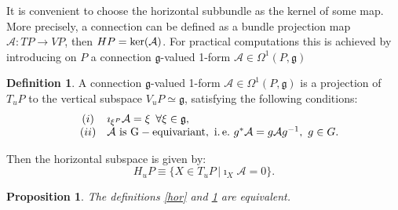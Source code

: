 \documentclass[11pt]{report}
\theoremstyle{plain}
\newtheorem{prop}[thm]{Proposition}
\theoremstyle{definition}
\newtheorem{defn}[thm]{Definition}
\theoremstyle{remark}
\theoremstyle{remark}
\numberwithin{equation}{section}
\begin{document}
It is convenient to choose the horizontal subbundle as the kernel of some map. More precisely, a connection can be defined as a bundle projection map $\mathcal{A}: TP \to VP$, then $HP = {\rm ker}(\mathcal{A})$. 
For practical computations this is achieved by introducing on $P$ a connection $\mathfrak{g}$-valued 1-form $\mathcal{A} \in \Omega^1(P,\mathfrak{g})$ 

\begin{defn}\label{form}
A connection $\mathfrak{g}$-valued 1-form $\mathcal{A} \in \Omega^1(P,\mathfrak{g})$ is a projection of $T_uP$ to the vertical subspace $V_uP \simeq \mathfrak{g}$, satisfying the following conditions:
\[\begin{array}{lcl}
&(i)& \imath_{\xi^P} \mathcal{A} = \xi \, \, \, \forall \xi \in \mathfrak{g},\\

&(ii)& \mathcal{A} \, \, {\rm is \, \, G-equivariant, \, \, i. \, e.} \, \,  g^* \mathcal{A} = g \mathcal{A} g^{-1}, \, \, g \in G.
\end{array}\]
\end{defn}

 Then the horizontal subspace is given by:
%
\begin{equation}
H_uP \equiv \{X \in T_uP \, | \imath_X \mathcal{A} = 0\}.
\end{equation}
%

\begin{prop}
The definitions \ref{hor} and \ref{form} are equivalent.
\end{prop}
\end{document}
